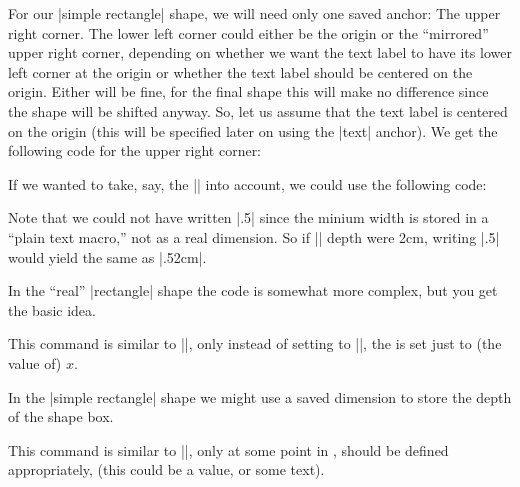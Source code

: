 \begin{command}{\pgfdeclareshape{}}
\begin{command}{\savedanchor{}}
    For our |simple rectangle| shape, we will need only one saved
    anchor: The upper right corner. The lower left corner could either
    be the origin or the ``mirrored'' upper right corner, depending on
    whether we want the text label to have its lower left corner at
    the origin or whether the text label should be centered on the
    origin. Either will be fine, for the final shape this will make no
    difference since the shape will be shifted anyway. So, let us
    assume that the text label is centered on the origin (this will be
    specified later on using the |text| anchor). We get 
    the following code for the upper right corner:
\begin{codeexample}
\savedanchor{\upperrightcorner}{
  \pgf@y=.5\ht\pgfnodeparttextbox %
  \pgf@x=.5\wd\pgfnodeparttextbox %
}
\end{codeexample}

    If we wanted to take, say, the |\pgfshapeminwidth| into account,
    we could use the following code:
    
\begin{codeexample}
\end{codeexample}
    Note that we could not have written |.5\pgfshapeminwidth| since
    the minium width is stored in a ``plain text macro,'' not as a
    real dimension. So if |\pgfshapeminwidth| depth were 
    2cm, writing |.5\pgfshapeminwidth| would yield the same as |.52cm|.

    In the ``real'' |rectangle| shape the code is somewhat more
    complex, but you get the basic idea.
  \end{command}  
  \begin{command}{\saveddimen{}}
    This command is similar to |\savedanchor|, only instead of setting
     to ||, the  is
    set just to (the value of) $x$.

    In the |simple rectangle| shape we might use a saved dimension to
    store the depth of the shape box.
  
\begin{codeexample}
\saveddimen{\depth}{
  \pgf@x=\dp\pgfnodeparttextbox 
}
\end{codeexample}
  \end{command}  
  \begin{command}{\savedmacro{}}
    This command is similar to |\saveddimen|, only at some point
    in ,  should be defined appropriately,
    (this could be a value, or some text).


\end{command}
\end{command}
